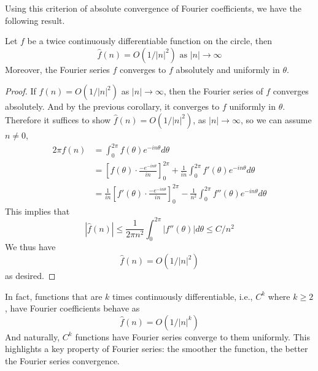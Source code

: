 Using this criterion of absolute convergence of Fourier coefficients, we have the following result.
\begin{cor}
    Let $f$ be a twice continuously differentiable function on the circle, then 
    \begin{equation*}
        \hat{f}(n)=O\left(1/|n|^2\right) \text{ as } |n|\to\infty
    \end{equation*}
    Moreover, the Fourier series $f$ converges to $f$ absolutely and uniformly in $\theta$.
\end{cor}
\begin{proof}
    If $\hat{f}(n)=O\left(1/|n|^2\right)$ as $|n|\to\infty$, then the Fourier series of $f$ converges absolutely. And by the previous corollary, it converges to $f$ uniformly in $\theta$. Therefore it suffices to show $\hat{f}(n)=O\left(1/|n|^2\right)$, as $|n|\to\infty$, so we can assume $n\neq 0$,
    \begin{align*}
        2\pi\hat{f}(n)&=\int_0^{2\pi}f(\theta)e^{-in\theta}d\theta\\
        &=\left[f(\theta)\cdot\frac{-e^{-in\theta}}{in}\right]_0^{2\pi}+\frac{1}{in}\int_0^{2\pi}f'(\theta)e^{-in\theta}d\theta\\
        &=\frac{1}{in}\left[f'(\theta)\cdot\frac{-e^{-in\theta}}{in}\right]_0^{2\pi}-\frac{1}{n^2}\int_0^{2\pi}f''(\theta)e^{-in\theta}d\theta
    \end{align*}
    This implies that 
    \begin{equation*}
        \left|\hat{f}(n)\right|\leq \frac{1}{2\pi n^2}\int_0^{2\pi}|f''(\theta)|d\theta\leq C/n^2
    \end{equation*}
    We thus have 
    \begin{equation*}
        \hat{f}(n)=O\left(1/|n|^2\right)
    \end{equation*}
    as desired.
\end{proof}
In fact, functions that are $k$ times continuously differentiable, i.e., $C^k$ where $k\geq 2$, have Fourier coefficients behave as 
\begin{equation*}
    \hat{f}(n)=O\left(1/|n|^k\right)
\end{equation*}
And naturally, $C^k$ functions have Fourier series converge to them uniformly. This highlights a key property of Fourier series: the smoother the function, the better the Fourier series convergence.

